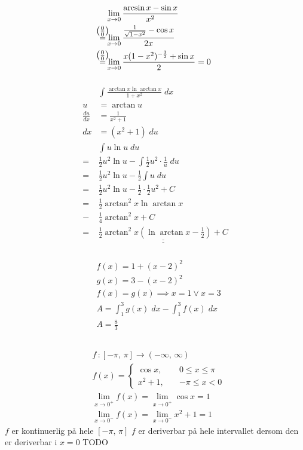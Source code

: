 \documentclass[defaultpackages]{cheatsheet}
\newcommand*{\myeq}[1]{\stackrel{\mathclap{\normalfont\mbox{$\left(#1\right)$}}}{=}}
\def\doubleunderline#1{\underline{\underline{#1}}}
\begin{document}
	\subsubsection{}
	\begin{align*}
		&\lim_{x\to 0} \frac{\arcsin x - \sin x}{x^2}\\
		\myeq{\frac{0}{0}}&\lim_{x\to 0} \frac{\frac{1}{\sqrt{1-x^2}} - \cos x}{2x}\\
		\myeq{\frac{0}{0}}&\lim_{x\to 0} \frac{x(1-x^2)^{-\frac{3}{2}}+\sin x}{2} = 0
	\end{align*}
	\subsubsection{}
	\begin{align*}
	&\int \frac{\arctan x \ln \arctan x}{1+x^2} \;dx\\
	u &= \arctan u\\
	\frac{du}{dx}&= \frac{1}{x^2+1}\\
	dx &= (x^2+1)\;du\\
	&\int u \ln u \; du\\
	=& \frac{1}{2} u^2 \ln u - \int \frac{1}{2}u^2 \cdot \frac{1}{u}\;du\\
	=& \frac{1}{2} u^2 \ln u - \frac{1}{2} \int u\;du\\
	=& \frac{1}{2} u^2 \ln u - \frac{1}{2} \cdot \frac{1}{2} u^2 + C \\
	=& \frac{1}{2} \arctan^2 x \ln \arctan x \\-& \frac{1}{4} \arctan^2x + C\\
	=& \doubleunderline{\frac{1}{2} \arctan^2 x (\ln \arctan x - \frac{1}{2}) + C}
	\end{align*}
	\subsubsection{}
	\begin{align*}
		&f(x) = 1 + (x-2)^2\\
		&g(x) = 3 - (x-2)^2\\
		&f(x)=g(x)\implies x=1 \vee x=3\\
		&A = \int_1^3 g(x) \;dx - \int_1^3 f(x) \;dx\\
		&A = \frac{8}{3}
	\end{align*}
	\subsection{}
	\begin{align*}
		&f \,\colon [-\pi,\,\pi] \to (-\infty,\,\infty)\\
		&f(x) = \begin{cases}
		\cos x,\quad &0\le x\le \pi\\
		x^2+1,\quad &-\pi \le x < 0
		\end{cases}\\
		&\lim_{x\to 0^+} f(x) = \lim_{x\to 0^+}\cos x = 1\\
		&\lim_{x\to 0^-} f(x) = \lim_{x\to 0^-}x^2+1 = 1
	\end{align*}
	$f$ er kontinuerlig på hele $[-\pi,\,\pi]$
	$f$ er deriverbar på hele intervallet dersom den er deriverbar i $x=0$
	TODO
\end{document}
